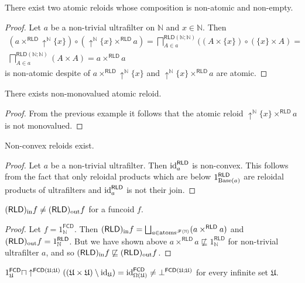 \begin{example}
There exist two atomic reloids whose composition is non-atomic and
non-empty.\end{example}
\begin{proof}
Let $a$ be a non-trivial ultrafilter on $\mathbb{N}$ and $x\in\mathbb{N}$.
Then
\begin{multline*}
(a\times^{\mathsf{RLD}}\uparrow^{\mathbb{N}}\{x\})\circ(\uparrow^{\mathbb{N}}\{x\}\times^{\mathsf{RLD}}a)=\bigsqcap_{A\in a}^{\mathsf{RLD}(\mathbb{N};\mathbb{N})}((A\times\{x\})\circ(\{x\}\times A)=\\
\bigsqcap_{A\in a}^{\mathsf{RLD}(\mathbb{N};\mathbb{N})}(A\times A)=a\times^{\mathsf{RLD}}a
\end{multline*}
is non-atomic despite of $a\times^{\mathsf{RLD}}\uparrow^{\mathbb{N}}\{x\}$
and $\uparrow^{\mathbb{N}}\{x\}\times^{\mathsf{RLD}}a$ are atomic.\end{proof}
\begin{example}
There exists non-monovalued atomic reloid.\end{example}
\begin{proof}
From the previous example it follows that the atomic reloid $\uparrow^{\mathbb{N}}\{x\}\times^{\mathsf{RLD}}a$
is not monovalued.\end{proof}
\begin{example}
Non-convex reloids exist.\end{example}
\begin{proof}
Let $a$ be a non-trivial ultrafilter. Then $\operatorname{id}_{a}^{\mathsf{RLD}}$
is non-convex. This follows from the fact that only reloidal products
which are below $1_{\operatorname{Base}(a)}^{\mathsf{RLD}}$ are reloidal products
of ultrafilters and $\operatorname{id}_{a}^{\mathsf{RLD}}$ is not their join.\end{proof}
\begin{example}
$(\mathsf{RLD})_{\mathrm{in}} f\ne(\mathsf{RLD})_{\mathrm{out}} f$ for a funcoid $f$.\end{example}
\begin{proof}
Let $f=1_{\mathbb{N}}^{\mathsf{FCD}}$. Then $(\mathsf{RLD})_{\mathrm{in}} f=\bigsqcup_{a\in\operatorname{atoms}^{\mathscr{F}(\mathbb{N})}}(a\times^{\mathsf{RLD}}a)$
and $(\mathsf{RLD})_{\mathrm{out}} f=1_{\mathbb{N}}^{\mathsf{RLD}}$. But we have shown
above $a\times^{\mathsf{RLD}}a\nsqsubseteq1_{\mathbb{N}}^{\mathsf{RLD}}$
for non-trivial ultrafilter $a$, and so $(\mathsf{RLD})_{\mathrm{in}} f\not\sqsubseteq(\mathsf{RLD})_{\mathrm{out}} f$.\end{proof}
\begin{prop}
\label{fcd-meet-frechet}$1_{\mathfrak{U}}^{\mathsf{FCD}}\sqcap\uparrow^{\mathsf{FCD}(\mathfrak{U};\mathfrak{U})}((\mathfrak{U}\times\mathfrak{U})\setminus\operatorname{id}_{\mathfrak{U}})=\operatorname{id}_{\Omega(\mathfrak{U})}^{\mathsf{FCD}}\ne\bot^{\mathsf{FCD}(\mathfrak{U};\mathfrak{U})}$
for every infinite set $\mathfrak{U}$.\end{prop}
